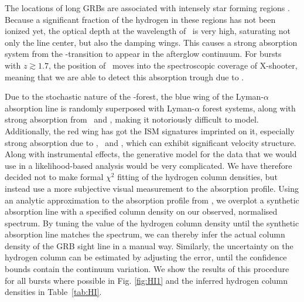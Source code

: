 \documentclass{aa}    %
\begin{document}
The locations of long GRBs are associated with intensely star forming regions
\citep{Hogg1999, Bloom2002, Fruchter2006}. Because a significant fraction of the
hydrogen in these regions has not been ionized yet, the optical depth at the
wavelength of \lya~is very high, saturating not only the line center, but also
the damping wings. This causes a strong absorption system from the
\lya-transition to appear in the afterglow continuum. For bursts with $z \gtrsim
1.7$, the position of \lya~moves into the spectroscopic coverage of X-shooter,
meaning that we are able to detect this absorption trough due to \lya.

Due to the stochastic nature of the \lya-forest, the blue wing of the
Lyman-$\alpha$ absorption line is randomly superposed with Lyman-$\alpha$ forest
systems, along with strong absorption from \mnii~and \SIiii, making it
notoriously difficult to model. Additionally, the red wing has got the ISM
signatures imprinted on it, especially strong absorption due to \SIii, \sii~and
\nv, which can exhibit significant velocity structure. Along with instrumental
effects, the generative model for the data that we would use in a
likelihood-based analysis would be very complicated. We have therefore decided
not to make formal $\chi^2$ fitting of the hydrogen column densities, but
instead use a more subjective visual measurement to the absorption profile. 
Using an analytic approximation to the absorption profile from
\citet{TepperGarcia2006}, we overplot a synthetic absorption line with a
specified column density on our observed, normalised spectrum. By tuning the
value of the hydrogen column density until the synthetic absorption line matches
the spectrum, we can thereby infer the actual column density of the GRB sight
line in a manual way. Similarly, the uncertainty on the hydrogen column can be
estimated by adjusting the error, until the confidence bounds contain the
continuum variation. We show the results of this procedure for all bursts where
possible in Fig. \ref{fig:HI1} and the inferred hydrogen column densities in
Table~\ref{tab:HI}.


\end{document}
